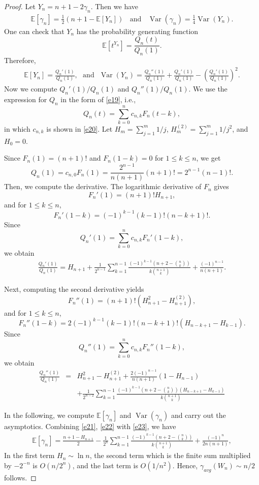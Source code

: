 \documentclass[12pt]{article}
\theoremstyle{definition}
\newcommand{\Var}{\operatorname{Var}}
\newcommand{\E}{\mathbb{E}}
\begin{document}
\begin{proof} Let \(Y_n=n+1-2\gamma_n\). Then we have
\begin{eqnarray}\label{e21}
\E[\gamma_n]=\frac12\left(n+1-\E[Y_n]\right) ~~~~\mbox{and}~~~~\Var(\gamma_n)=\frac14\Var(Y_n).\end{eqnarray}
One can check that $Y_n$ has the probability generating function
\[
\E[t^{Y_n}]=\frac{Q_n(t)}{Q_n(1)}.
\]
Therefore,
\begin{eqnarray}\label{e22}\E[Y_n]=\frac{Q_n'(1)}{Q_n(1)},~~~\mbox{and}~~~
\Var(Y_n)=\frac{Q_n''(1)}{Q_n(1)}
+\frac{Q_n'(1)}{Q_n(1)}
-\left(\frac{Q_n'(1)}{Q_n(1)}\right)^2.\end{eqnarray}
Now we compute $Q_n'(1)/Q_n(1)$ and $Q_n''(1)/Q_n(1)$. We use the expression for $Q_n$ in the form of \eqref{e19}, i.e., \[
Q_n(t)=\sum_{k=0}^{n}c_{n,k}F_n(t-k),
\] in which $c_{n,k}$ is shown in \eqref{e20}.  Let \(H_m=\sum_{j=1}^m1/j\), \(H_m^{(2)}=\sum_{j=1}^m1/j^2\), and \(H_0=0\).

Since \(F_n(1)=(n+1)!\)  and \(F_n(1-k)=0\)  for \(1\le k\le n\), we get
\[
Q_n(1)=c_{n,0}F_n(1)=\frac{2^{n-1}}{n(n+1)}(n+1)!=2^{n-1}(n-1)!.
\]
Then, we compute the derivative. The logarithmic derivative of \(F_n\) gives
\[
F_n'(1)=(n+1)!H_{n+1},
\]
and for \(1\le k\le n\),
\[
F_n'(1-k)=(-1)^{k-1}(k-1)!(n-k+1)!.
\]
Since
\[
Q_n'(1)=\sum_{k=0}^n c_{n,k}F_n'(1-k),
\]
we obtain
\begin{eqnarray}\label{e23}
\frac{Q_n'(1)}{Q_n(1)}
=
H_{n+1}
+
\frac{1}{2^{n-1}}
\sum_{k=1}^{n-1}
\frac{(-1)^{k-1}\left(n+2-\binom{n}{k}\right)}
{k\binom{n+1}{k}}
+
\frac{(-1)^{n-1}}{n(n+1)}.
\end{eqnarray}

Next, computing the second derivative yields
\[
F_n''(1)=(n+1)!\left(H_{n+1}^2-H_{n+1}^{(2)}\right),
\]
and for \(1\le k\le n\),
\[
F_n''(1-k)=2(-1)^{k-1}(k-1)!(n-k+1)!\left(H_{n-k+1}-H_{k-1}\right).
\]
Since
\[
Q_n''(1)=\sum_{k=0}^n c_{n,k}F_n''(1-k),
\] we obtain
\begin{eqnarray}\label{e24}
\frac{Q_n''(1)}{Q_n(1)}
&=&H_{n+1}^2-H_{n+1}^{(2)}+\frac{2(-1)^{n-1}}{n(n+1)}(1-H_{n-1})\nonumber\\
&&+\frac{1}{2^{n-2}}
\sum_{k=1}^{n-1}
\frac{(-1)^{k-1}\left(n+2-\binom{n}{k}\right)
\left(H_{n-k+1}-H_{k-1}\right)}
{k\binom{n+1}{k}}
\end{eqnarray}

In the following, we compute $\E[\gamma_n]$ and $\Var(\gamma_n)$ and carry out the asymptotics.
Combining \eqref{e21}, \eqref{e22} with \eqref{e23}, we have
\begin{eqnarray}\label{e25}
\E[{\gamma_n}]=
\frac{n+1-H_{n+1}}{2}
-\frac{1}{2^n}
\sum_{k=1}^{n-1}
\frac{(-1)^{k-1}\left(n+2-\binom{n}{k}\right)}
{k\binom{n+1}{k}}
+\frac{(-1)^n}{2n(n+1)},
\end{eqnarray}
In the first term $H_n\sim \ln n$, the second term which is the finite sum multiplied by $-2^{-n}$ is
$O(n/2^{n})$, and the last term is $O(1/n^{2})$. Hence, $\gamma_{avg}(W_n)\sim n/2$ follows.


\end{proof}
\end{document}
